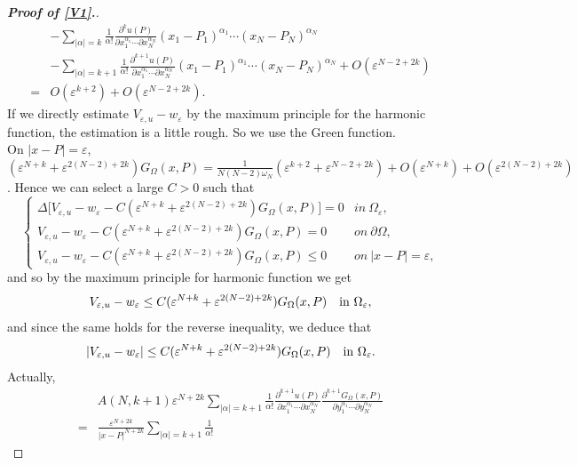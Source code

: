 \documentclass[11pt,reqno]{article}
\numberwithin{equation}{section}
\newcommand\e\varepsilon
\renewcommand\O\Omega
\begin{document}
\begin{proof}[\bf Proof of \eqref{V1}.]
\begin{equation}
\begin{aligned}
				&-\sum_{|\alpha|=k}\frac1{\alpha!}
					\frac{\partial^ku(P)}{\partial x_1^{\alpha_1}\cdots\partial x_N^{\alpha_N}}(x_1-P_1)^{\alpha_1}\cdots(x_N-P_N)^{\alpha_N}\\
                    &-\sum_{|\alpha|=k+1}\frac1{\alpha!}
					\frac{\partial^{k+1}u(P)}{\partial x_1^{\alpha_1}\cdots\partial x_N^{\alpha_N}}(x_1-P_1)^{\alpha_1}\cdots(x_N-P_N)^{\alpha_N}+O(\e^{N-2+2k})\\
                    =&O(\e^{k+2})+O(\e^{N-2+2k}).
			\end{aligned}
            \end{equation}
		If we directly estimate $V_{\e,u}-w_\e$ by the maximum principle for the harmonic function, the estimation is a little rough. So we use the Green function.\\ On $|x-P|=\e$, $(\e^{N+k}+\e^{2(N-2)+2k})G_{\Omega}(x,P)=\frac1{N(N-2)\omega_N}(\e^{k+2}+\e^{N-2+2k})+O(\e^{N+k})+O(\e^{2(N-2)+2k})$. Hence we can select a large $C>0$ such that   
				\begin{equation}
					\begin{cases}
						\Delta\Big[V_{\e,u}-w_\e-C(\e^{N+k}+\e^{2(N-2)+2k})G_{\Omega}(x,P)\Big]=0&in\ \O_\e,\\
						V_{\e,u}-w_\e-C(\e^{N+k}+\e^{2(N-2)+2k})G_{\Omega}(x,P)=0&on\ \partial\O,\\
						V_{\e,u}-w_\e-C(\e^{N+k}+\e^{2(N-2)+2k})G_{\Omega}(x,P)\le 0&on\ |x-P|=\e,
					\end{cases}
				\end{equation}
				and so by the maximum principle for harmonic function we get
				\begin{equation}
					V_{\e,u}-w_\e \le C(\e^{N+k}+\e^{2(N-2)+2k})G_{\Omega}(x,P)\quad\hbox{in }\O_\e,
				\end{equation}
				and since the same holds for the reverse inequality, we deduce that \begin{equation}\label{eq-0922-1}
					|	V_{\e,u}-w_\e |\leq C(\e^{N+k}+\e^{2(N-2)+2k})G_{\Omega}(x,P)\quad\hbox{in }\O_\e.
				\end{equation}
                Actually,
                 \begin{align*}
					&A(N,k+1) \e^{N+2k}	\sum_{|\alpha|=k+1}\frac1{\alpha!}
					\frac{\partial^{k+1}u(P)}{\partial x_1^{\alpha_1}\cdots\partial x_N^{\alpha_N}}
					\frac{\partial^{k+1}G_{\Omega}(x,P)}{\partial y_1^{\alpha_1}\cdots\partial y_N^{\alpha_N}}\\
                    =&\frac{\e^{N+2k}}{|x-P|^{N+2k}}\sum_{|\alpha|=k+1}\frac1{\alpha!}

\end{align*}
\end{proof}
\end{document}

